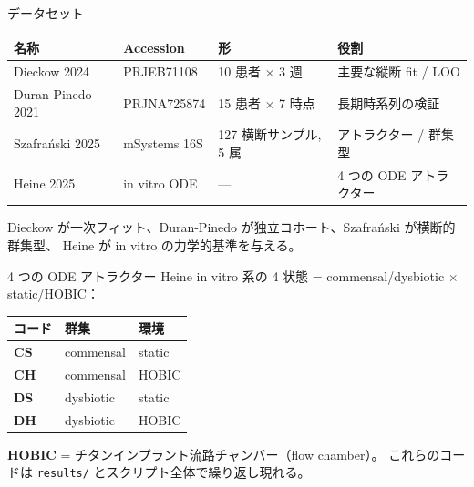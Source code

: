 \documentclass[
  ignorenonframetext,
  aspectratio=169,
]{beamer}
\begin{document}
\begin{frame}{データセット}
\protect\hypertarget{ux30c7ux30fcux30bfux30bbux30c3ux30c8}{}
\begin{longtable}[]{@{}llll@{}}
\toprule
名称 & Accession & 形 & 役割 \\
\midrule
\endhead
Dieckow 2024 & PRJEB71108 & 10 患者 \(\times\) 3 週 & 主要な縦断 fit /
LOO \\
Duran-Pinedo 2021 & PRJNA725874 & 15 患者 \(\times\) 7 時点 &
長期時系列の検証 \\
Szafrański 2025 & mSystems 16S & 127 横断サンプル, 5 属 & アトラクター /
群集型 \\
Heine 2025 & in vitro ODE & --- & 4 つの ODE アトラクター \\
\bottomrule
\end{longtable}

\vspace{0.3em}

Dieckow が一次フィット、Duran-Pinedo が独立コホート、Szafrański
が横断的群集型、 Heine が in vitro の力学的基準を与える。
\end{frame}

\begin{frame}[fragile]{4 つの ODE アトラクター}
\protect\hypertarget{ux3064ux306e-ode-ux30a2ux30c8ux30e9ux30afux30bfux30fc}{}
Heine in vitro 系の 4 状態 = commensal/dysbiotic \(\times\)
static/HOBIC：

\begin{longtable}[]{@{}lll@{}}
\toprule
コード & 群集 & 環境 \\
\midrule
\endhead
\textbf{CS} & commensal & static \\
\textbf{CH} & commensal & HOBIC \\
\textbf{DS} & dysbiotic & static \\
\textbf{DH} & dysbiotic & HOBIC \\
\bottomrule
\end{longtable}

\vspace{0.2em}

\textbf{HOBIC} = チタンインプラント流路チャンバー（flow chamber）。
これらのコードは \texttt{results/} とスクリプト全体で繰り返し現れる。
\end{frame}
\end{document}

